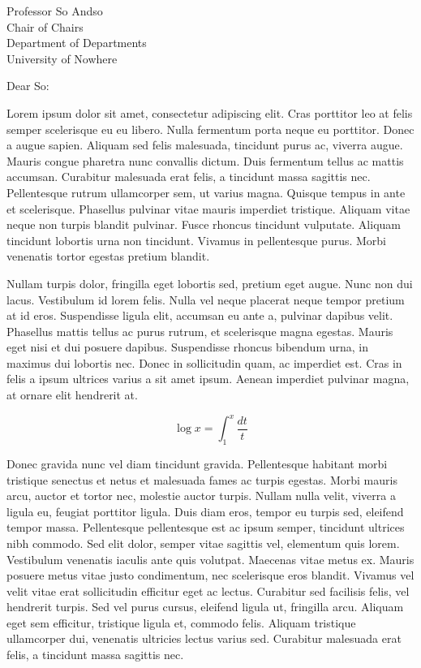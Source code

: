 \documentclass[letterpaper]{mscsletter}
\begin{document}
\begin{letter}{
Professor So Andso\\
Chair of Chairs\\
Department of Departments\\
University of Nowhere\\
}

\opening{Dear So:}

Lorem ipsum dolor sit amet, consectetur adipiscing elit. Cras
porttitor leo at felis semper scelerisque eu eu libero. Nulla
fermentum porta neque eu porttitor. Donec a augue sapien. Aliquam sed
felis malesuada, tincidunt purus ac, viverra augue. Mauris congue
pharetra nunc convallis dictum. Duis fermentum tellus ac mattis
accumsan. Curabitur malesuada erat felis, a tincidunt massa sagittis
nec. Pellentesque rutrum ullamcorper sem, ut varius magna. Quisque
tempus in ante et scelerisque. Phasellus pulvinar vitae mauris
imperdiet tristique. Aliquam vitae neque non turpis blandit
pulvinar. Fusce rhoncus tincidunt vulputate. Aliquam tincidunt
lobortis urna non tincidunt. Vivamus in pellentesque purus. Morbi
venenatis tortor egestas pretium blandit.

Nullam turpis dolor, fringilla eget lobortis sed, pretium eget
augue. Nunc non dui lacus. Vestibulum id lorem felis. Nulla vel neque
placerat neque tempor pretium at id eros. Suspendisse ligula elit,
accumsan eu ante a, pulvinar dapibus velit. Phasellus mattis tellus ac
purus rutrum, et scelerisque magna egestas. Mauris eget nisi et dui
posuere dapibus. Suspendisse rhoncus bibendum urna, in maximus dui
lobortis nec. Donec in sollicitudin quam, ac imperdiet est. Cras in
felis a ipsum ultrices varius a sit amet ipsum. Aenean imperdiet
pulvinar magna, at ornare elit hendrerit at.

$$\log x = \int_1^x\frac{dt}{t}$$

Donec gravida nunc vel diam tincidunt gravida. Pellentesque habitant
morbi tristique senectus et netus et malesuada fames ac turpis
egestas. Morbi mauris arcu, auctor et tortor nec, molestie auctor
turpis. Nullam nulla velit, viverra a ligula eu, feugiat porttitor
ligula. Duis diam eros, tempor eu turpis sed, eleifend tempor
massa. Pellentesque pellentesque est ac ipsum semper, tincidunt
ultrices nibh commodo. Sed elit dolor, semper vitae sagittis vel,
elementum quis lorem. Vestibulum venenatis iaculis ante quis
volutpat. Maecenas vitae metus ex. Mauris posuere metus vitae justo
condimentum, nec scelerisque eros blandit. Vivamus vel velit vitae
erat sollicitudin efficitur eget ac lectus. Curabitur sed facilisis
felis, vel hendrerit turpis. Sed vel purus cursus, eleifend ligula ut,
fringilla arcu. Aliquam eget sem efficitur, tristique ligula et,
commodo felis. Aliquam tristique ullamcorper dui, venenatis ultricies
lectus varius sed. Curabitur malesuada erat felis, a tincidunt massa sagittis
nec.


\end{letter}
\end{document}

